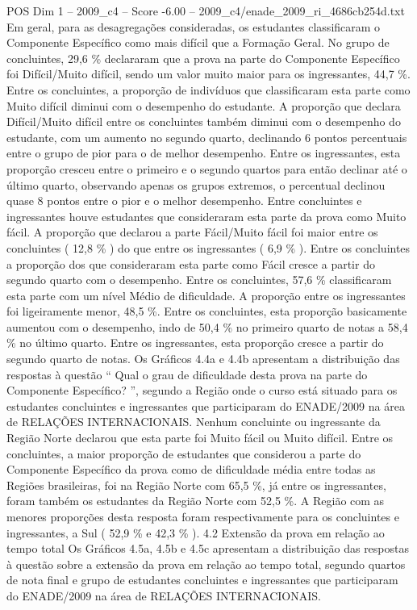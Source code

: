 \begin{textsample}{POS Dim 1 – 2009\_c4 – Score -6.00 – 2009\_c4/enade\_2009\_ri\_4686cb254d.txt}
Em geral, para as desagregações consideradas, os estudantes classificaram o Componente Específico como mais difícil que a Formação Geral.
No grupo de concluintes, 29,6 \% declararam que a prova na parte do Componente Específico foi Difícil/Muito difícil, sendo um valor muito maior para os ingressantes, 44,7 \%.
Entre os concluintes, a proporção de indivíduos que classificaram esta parte como Muito difícil diminui com o desempenho do estudante.
A proporção que declara Difícil/Muito difícil entre os concluintes também diminui com o desempenho do estudante, com um aumento no segundo quarto, declinando 6 pontos percentuais entre o grupo de pior para o de melhor desempenho.
Entre os ingressantes, esta proporção cresceu entre o primeiro e o segundo quartos para então declinar até o último quarto, observando apenas os grupos extremos, o percentual declinou quase 8 pontos entre o pior e o melhor desempenho.
Entre concluintes e ingressantes houve estudantes que consideraram esta parte da prova como Muito fácil.
A proporção que declarou a parte Fácil/Muito fácil foi maior entre os concluintes ( 12,8 \% ) do que entre os ingressantes ( 6,9 \% ).
Entre os concluintes a proporção dos que consideraram esta parte como Fácil cresce a partir do segundo quarto com o desempenho.
Entre os concluintes, 57,6 \% classificaram esta parte com um nível Médio de dificuldade.
A proporção entre os ingressantes foi ligeiramente menor, 48,5 \%.
Entre os concluintes, esta proporção basicamente aumentou com o desempenho, indo de 50,4 \% no primeiro quarto de notas a 58,4 \% no último quarto.
Entre os ingressantes, esta proporção cresce a partir do segundo quarto de notas.
Os Gráficos 4.4a e 4.4b apresentam a distribuição das respostas à questão “ Qual o grau de dificuldade desta prova na parte do Componente Específico? ”, segundo a Região onde o curso está situado para os estudantes concluintes e ingressantes que participaram do ENADE/2009 na área de RELAÇÕES INTERNACIONAIS.
Nenhum concluinte ou ingressante da Região Norte declarou que esta parte foi Muito fácil ou Muito difícil.
Entre os concluintes, a maior proporção de estudantes que considerou a parte do Componente Específico da prova como de dificuldade média entre todas as Regiões brasileiras, foi na Região Norte com 65,5 \%, já entre os ingressantes, foram também os estudantes da Região Norte com 52,5 \%.
A Região com as menores proporções desta resposta foram respectivamente para os concluintes e ingressantes, a Sul ( 52,9 \% e 42,3 \% ). 4.2 Extensão da prova em relação ao tempo total Os Gráficos 4.5a, 4.5b e 4.5c apresentam a distribuição das respostas à questão sobre a extensão da prova em relação ao tempo total, segundo quartos de nota final e grupo de estudantes concluintes e ingressantes que participaram do ENADE/2009 na área de RELAÇÕES INTERNACIONAIS.

\end{textsample}
